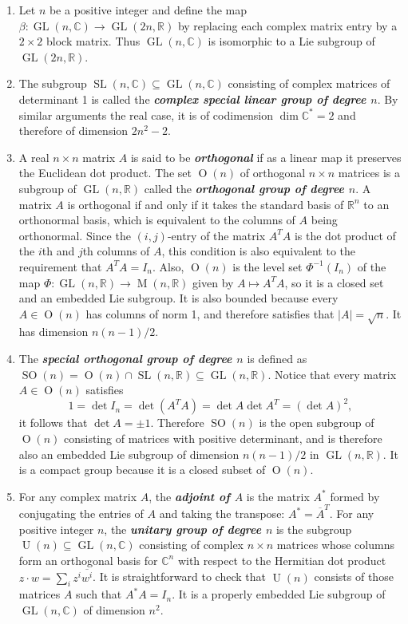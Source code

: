 \documentclass{article}
\numberwithin{equation}{section}
\newcommand{\R}{\mathbb{R}}
\newcommand{\C}{\mathbb{C}}
\renewcommand{\O}{\operatorname{O}}
\DeclareMathOperator{\GL}{GL}
\DeclareMathOperator{\SL}{SL}
\DeclareMathOperator{\SO}{SO}
\DeclareMathOperator{\U}{U}
\begin{document}
\begin{example}
\begin{enumerate}
		\item Let $n$ be a positive integer and define the map $\beta:\GL(n,\C)\to\GL(2n,\R)$ by replacing each complex matrix entry by a $2\times 2$ block matrix. Thus $\GL(n,\C)$ is isomorphic to a Lie subgroup of $\GL(2n,\R)$.
		\item The subgroup $\SL(n,\C)\subseteq\GL(n,\C)$ consisting of complex matrices of determinant 1 is called the \textbf{\textit{complex special linear group of degree $n$}}. By similar arguments the real case, it is of codimension $\dim\C^*=2$ and therefore of dimension $2n^2-2$.
		\item A real $n\times n$ matrix $A$ is said to be \textbf{\textit{orthogonal}} if as a linear map it preserves the Euclidean dot product. The set $\O(n)$ of orthogonal $n\times n$ matrices is a subgroup of $\GL(n,\R)$ called the \textbf{\textit{orthogonal group of degree $n$}}. A matrix $A$ is orthogonal if and only if it takes the standard basis of $\R^n$ to an orthonormal basis, which is equivalent to the columns of $A$ being orthonormal. Since the $(i,j)$-entry of the matrix $A^TA$ is the dot product of the $i$th and $j$th columns of $A$, this condition is also equivalent to the requirement that $A^TA=I_n$. Also, $\O(n)$ is the level set $\Phi^{-1}(I_n)$ of the map $\Phi:\GL(n,\R)\to\operatorname{M}(n,\R)$ given by $A\mapsto A^TA$, so it is a closed set and an embedded Lie subgroup. It is also bounded because every $A\in\O(n)$ has columns of norm 1, and therefore satisfies that $|A|=\sqrt{n}$. It has dimension $n(n-1)/2$.
		\item The \textbf{\textit{special orthogonal group of degree $n$}} is defined as $\SO(n)=\O(n)\cap\SL(n,\R)\subseteq\GL(n,\R)$. Notice that every matrix $A\in\O(n)$ satisfies
		\[1=\det I_n=\det(A^TA)=\det A\det A^T=(\det A)^2,\]
		it follows that $\det A=\pm1$. Therefore $\SO(n)$ is the open subgroup of $\O(n)$ consisting of matrices with positive determinant, and is therefore also an embedded Lie subgroup of dimension $n(n-1)/2$ in $\GL(n,\R)$. It is a compact group because it is a closed subset of $\O(n)$.
		\item For any complex matrix $A$, the \textbf{\textit{adjoint of $A$}} is the matrix $A^*$ formed by conjugating the entries of $A$ and taking the transpose: $A^*=\overline{A}^T$. For any positive integer $n$, the \textbf{\textit{unitary group of degree $n$}} is the subgroup $\U(n)\subseteq\GL(n,\C)$ consisting of complex $n\times n$ matrices whose columns form an orthogonal basis for $\C^n$ with respect to the Hermitian dot product $z\cdot w=\sum_iz^i\overline{w^i}$. It is straightforward to check that $\U(n)$ consists of those matrices $A$ such that $A^*A=I_n$. It is a properly embedded Lie subgroup of $\GL(n,\C)$ of dimension $n^2$.

\end{enumerate}
\end{example}
\end{document}
